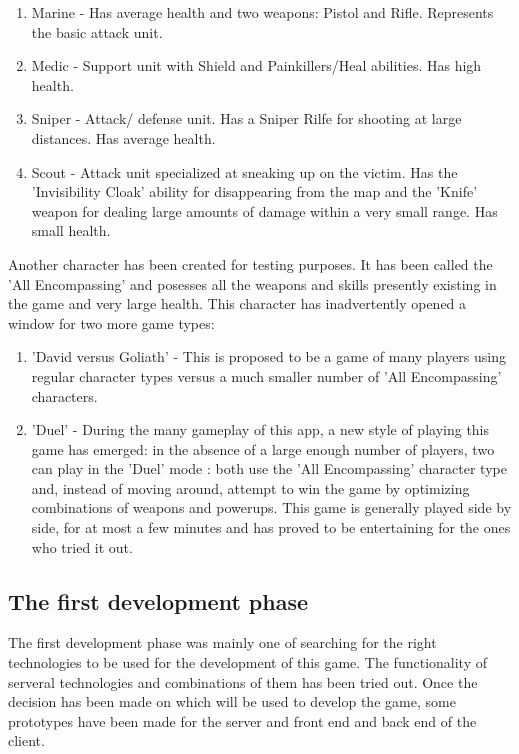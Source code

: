 \begin{enumerate}
  \item Marine - Has average health and two weapons: Pistol and Rifle.
  Represents the basic attack unit.
  
  \item Medic - Support unit with Shield and Painkillers/Heal abilities. Has
  high health.
   
  \item Sniper - Attack/ defense unit. Has a Sniper Rilfe for shooting at large
  distances. Has average health.
  
  \item Scout - Attack unit specialized at sneaking up on the victim. Has the
  'Invisibility Cloak' ability for disappearing from the map and the 'Knife'
  weapon for dealing large amounts of damage within a very small range. Has
  small health.
  
\end{enumerate}

Another character has been created for testing purposes. It has been called the
'All Encompassing' and posesses all the weapons and skills presently existing in
the game and very large health. This character has inadvertently opened a window
for two more game types:

\begin{enumerate}
  \item 'David versus Goliath' - This is proposed to be a game of many players
  using regular character types versus a much smaller number of 'All
  Encompassing' characters.
  
  \item 'Duel' - During the many gameplay of this app, a new style of playing
  this game has emerged: in the absence of a large enough number of players, two
  can play in the 'Duel' mode : both use the 'All Encompassing' character type
  and, instead of moving around, attempt to win the game by optimizing  
  combinations of weapons and powerups. This game is generally played side by
  side, for at most a few minutes and has proved to be entertaining for the ones
  who tried it out.
\end{enumerate}



\subsection{The first development phase}

The first development phase was mainly one of searching for the right
technologies to be used for the development of this game. The functionality
of serveral technologies and combinations of them has been tried out. Once
the decision has been made on which will be used to develop the game, some
prototypes have been made for the server and front end and back end of the
client.\newline

